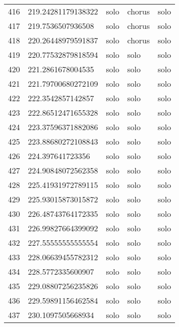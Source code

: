 \begin{table}[]
\begin{tabular}{lllll}
    416  & 219.24281179138322 & solo         & chorus          & solo           \\
    417  & 219.7536507936508  & solo         & chorus          & solo           \\
    418  & 220.26448979591837 & solo         & chorus          & solo           \\
    419  & 220.77532879818594 & solo         & solo            & solo           \\
    420  & 221.2861678004535  & solo         & solo            & solo           \\
    421  & 221.79700680272109 & solo         & solo            & solo           \\
    422  & 222.3542857142857  & solo         & solo            & solo           \\
    423  & 222.86512471655328 & solo         & solo            & solo           \\
    424  & 223.37596371882086 & solo         & solo            & solo           \\
    425  & 223.88680272108843 & solo         & solo            & solo           \\
    426  & 224.397641723356   & solo         & solo            & solo           \\
    427  & 224.90848072562358 & solo         & solo            & solo           \\
    428  & 225.41931972789115 & solo         & solo            & solo           \\
    429  & 225.93015873015872 & solo         & solo            & solo           \\
    430  & 226.48743764172335 & solo         & solo            & solo           \\
    431  & 226.99827664399092 & solo         & solo            & solo           \\
    432  & 227.55555555555554 & solo         & solo            & solo           \\
    433  & 228.06639455782312 & solo         & solo            & solo           \\
    434  & 228.5772335600907  & solo         & solo            & solo           \\
    435  & 229.08807256235826 & solo         & solo            & solo           \\
    436  & 229.59891156462584 & solo         & solo            & solo           \\
    437  & 230.1097505668934  & solo         & solo            & solo           \\

\end{tabular}
\end{table}
